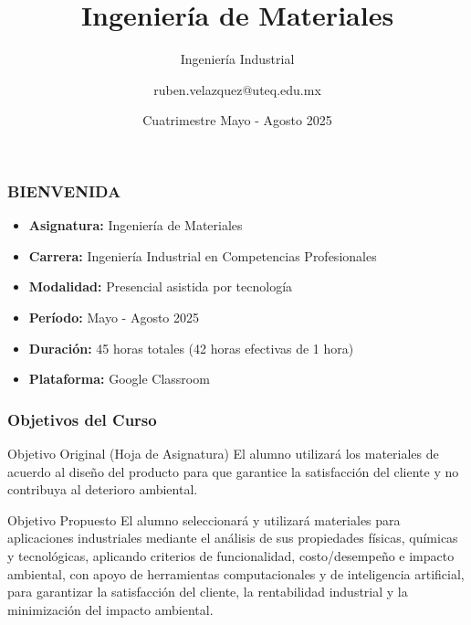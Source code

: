 \documentclass{beamer}
\title[Ing. Materiales]{Ingeniería de Materiales}
\subtitle{Ingeniería Industrial}
\author{ruben.velazquez@uteq.edu.mx}
\institute[UTEQ]{Universidad Tecnológica de Querétaro}
\date{Cuatrimestre Mayo - Agosto 2025}
\begin{document}
\frame{\titlepage}

\begin{frame}
    \frametitle{BIENVENIDA}
    \begin{itemize}
        \item \textbf{Asignatura:} Ingeniería de Materiales
        \item \textbf{Carrera:} Ingeniería Industrial en Competencias Profesionales
        \item \textbf{Modalidad:} Presencial asistida por tecnología
        \item \textbf{Período:} Mayo - Agosto 2025
        \item \textbf{Duración:} 45 horas totales (42 horas efectivas de 1 hora)
        \item \textbf{Plataforma:} Google Classroom
    \end{itemize}
\end{frame}

	
\begin{frame}
    \frametitle{Objetivos del Curso}
   \begin{block}{Objetivo Original (Hoja de Asignatura)}
   		El alumno utilizará los materiales de acuerdo al diseño del producto para que garantice la satisfacción del cliente y no contribuya al deterioro ambiental.
   \end{block}
   \begin{block}{Objetivo Propuesto}
   		El alumno seleccionará y utilizará materiales para aplicaciones industriales mediante el análisis de sus propiedades físicas, químicas y tecnológicas, aplicando criterios de funcionalidad, costo/desempeño e impacto ambiental, con apoyo de herramientas computacionales y de inteligencia artificial, para garantizar la satisfacción del cliente, la rentabilidad industrial y la minimización del impacto ambiental.
    \end{block}
\end{frame}
\end{document}
